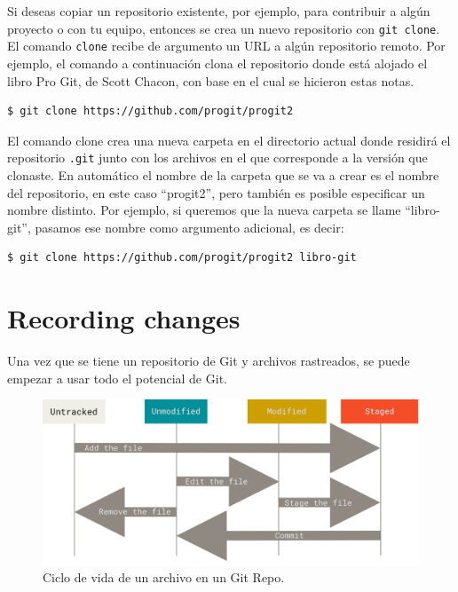 \documentclass[spanish, 12pt, a4paper]{article}
\begin{document}
Si deseas copiar un repositorio existente, por ejemplo, para contribuir
a algún proyecto o con tu equipo, entonces se crea un nuevo repositorio
con \passthrough{\lstinline!git clone!}. El comando
\passthrough{\lstinline!clone!} recibe de argumento un URL a algún
repositorio remoto. Por ejemplo, el comando a continuación clona el
repositorio donde está alojado el libro Pro Git, de Scott Chacon, con
base en el cual se hicieron estas notas.

\begin{lstlisting}
$ git clone https://github.com/progit/progit2
\end{lstlisting}

El comando clone crea una nueva carpeta en el directorio actual donde
residirá el repositorio \passthrough{\lstinline!.git!} junto con los
archivos en el que corresponde a la versión que clonaste. En automático
el nombre de la carpeta que se va a crear es el nombre del repositorio,
en este caso ``progit2'', pero también es posible especificar un nombre
distinto. Por ejemplo, si queremos que la nueva carpeta se llame
``libro-git'', pasamos ese nombre como argumento adicional, es decir:

\begin{lstlisting}
$ git clone https://github.com/progit/progit2 libro-git
\end{lstlisting}

\section{Recording changes}

Una vez que se tiene un repositorio de Git y archivos rastreados, se
puede empezar a usar todo el potencial de Git.

\begin{figure}
\centering
\includegraphics{figs/lifecycle.png}
\caption{Ciclo de vida de un archivo en un Git Repo.{}}
\end{figure}
\end{document}

